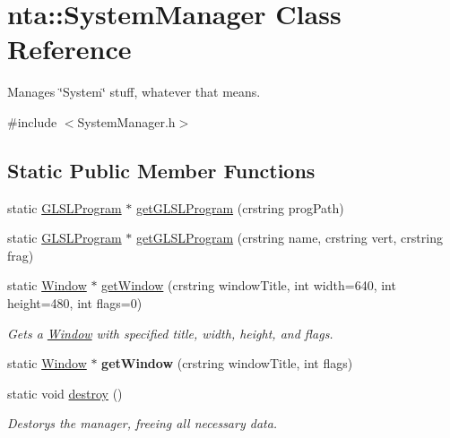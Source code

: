 \hypertarget{classnta_1_1SystemManager}{}\section{nta\+:\+:System\+Manager Class Reference}
\label{classnta_1_1SystemManager}


Manages \char`\"{}\+System\char`\"{} stuff, whatever that means.  




{\ttfamily \#include $<$System\+Manager.\+h$>$}

\subsection*{Static Public Member Functions}
\begin{DoxyCompactItemize}
\item 
static \hyperlink{classnta_1_1GLSLProgram}{G\+L\+S\+L\+Program} $\ast$ \hyperlink{classnta_1_1SystemManager_af37be3ff4538da0a95b5ca257187077c}{get\+G\+L\+S\+L\+Program} (crstring prog\+Path)
\item 
static \hyperlink{classnta_1_1GLSLProgram}{G\+L\+S\+L\+Program} $\ast$ \hyperlink{classnta_1_1SystemManager_a656e005054ec89f1370616aa499b8a1a}{get\+G\+L\+S\+L\+Program} (crstring name, crstring vert, crstring frag)
\item 
\mbox{\label{classnta_1_1SystemManager_add3089790707aaf982e43b69317fe30a}} 
static \hyperlink{classnta_1_1Window}{Window} $\ast$ \hyperlink{classnta_1_1SystemManager_add3089790707aaf982e43b69317fe30a}{get\+Window} (crstring window\+Title, int width=640, int height=480, int flags=0)
\begin{DoxyCompactList}\small\item\em Gets a \hyperlink{classnta_1_1Window}{Window} with specified title, width, height, and flags. \end{DoxyCompactList}\item 
\mbox{\label{classnta_1_1SystemManager_a76ef4114ece83e7492600960190211b1}} 
static \hyperlink{classnta_1_1Window}{Window} $\ast$ {\bfseries get\+Window} (crstring window\+Title, int flags)
\item 
\mbox{\label{classnta_1_1SystemManager_a69721eaa78fda16f0f028d2991672282}} 
static void \hyperlink{classnta_1_1SystemManager_a69721eaa78fda16f0f028d2991672282}{destroy} ()
\begin{DoxyCompactList}\small\item\em Destorys the manager, freeing all necessary data. \end{DoxyCompactList}\end{DoxyCompactItemize}
